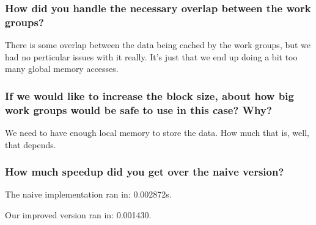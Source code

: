 \documentclass[a4paper,12pt]{article}
\begin{document}
\subsubsection{How did you handle the necessary overlap between the work groups?}

There is some overlap between the data being cached by the work groups, but we had no perticular issues with it really. It's just that we end up doing a bit too many global memory accesses.


\subsubsection{If we would like to increase the block size, about how big work groups would be safe to use in this case? Why?}

We need to have enough local memory to store the data. How much that is, well, that depends.


\subsubsection{How much speedup did you get over the naive version?}

The naive implementation ran in: 0.002872s.

Our improved version ran in: 0.001430.
\end{document}
